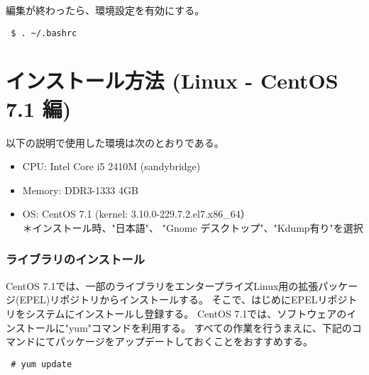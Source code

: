 編集が終わったら、環境設定を有効にする。
\begin{verbatim}
 $ . ~/.bashrc
\end{verbatim}


%
%


\section{インストール方法 (Linux - CentOS 7.1 編)} \label{chap:install_centos71}

以下の説明で使用した環境は次のとおりである。
\begin{itemize}
\item CPU: Intel Core i5 2410M (sandybridge)
\item Memory: DDR3-1333 4GB
\item OS: CentOS 7.1 (kernel: 3.10.0-229.7.2.el7.x86\_64）\\
{\small ＊インストール時、"日本語"、 "Gnome デスクトップ"、"Kdump有り"を選択}
\end{itemize}

\subsubsection{ライブラリのインストール}

CentOS 7.1では、一部のライブラリをエンタープライズLinux用の拡張パッケージ(EPEL)リポジトリからインストールする。
そこで、はじめにEPELリポジトリをシステムにインストールし登録する。
CentOS 7.1では、ソフトウェアのインストールに"yum"コマンドを利用する。
すべての作業を行うまえに、下記のコマンドにてパッケージをアップデートしておくことをおすすめする。
\begin{verbatim}
 # yum update
\end{verbatim}

